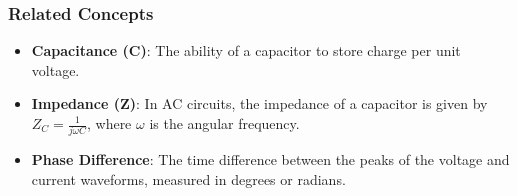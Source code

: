 \subsubsection{Related Concepts}
\begin{itemize}
    \item \textbf{Capacitance (C)}: The ability of a capacitor to store charge per unit voltage.
    \item \textbf{Impedance (Z)}: In AC circuits, the impedance of a capacitor is given by \( Z_C = \frac{1}{j\omega C} \), where \( \omega \) is the angular frequency.
    \item \textbf{Phase Difference}: The time difference between the peaks of the voltage and current waveforms, measured in degrees or radians.
\end{itemize}

